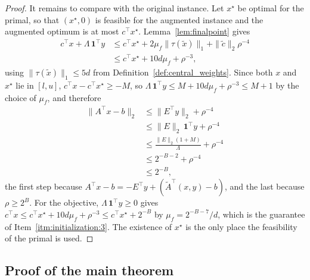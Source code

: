 \documentclass[11pt]{article}
\begin{document}
\begin{proof}
It remains to compare with the original instance. Let
$x^\star$ be optimal for the primal, so that
$(x^\star, 0)$ is feasible for the augmented instance and the augmented
optimum is at most
$c^\top x^\star$. Lemma~\ref{lem:finalpoint} gives
\[
\begin{aligned}
c^\top x + \Lambda \, \mathbf{1}^\top y
&\le
c^\top x^\star
+ 2 \mu_f \|\tau(\widetilde x)\|_1
+ \|\widetilde c\|_2 \rho^{-4}
\\
&\le
c^\top x^\star + 10 d \mu_f + \rho^{-3},
\end{aligned}
\]
using $\|\tau(\widetilde x)\|_1 \le 5 d$ from
Definition~\ref{def:central_weights}. Since both $x$ and
$x^\star$ lie in $[l, u]$,
$c^\top x - c^\top x^\star \ge -M$, so
$\Lambda \, \mathbf{1}^\top y \le M + 10 d \mu_f + \rho^{-3} \le M + 1$
by the choice of $\mu_f$, and therefore
\[
\begin{aligned}
\| A^\top x - b \|_2
&\le
\| E^\top y \|_2 + \rho^{-4}
\\
&\le
\|E\|_2 \, \mathbf{1}^\top y + \rho^{-4}
\\
&\le
\frac{ \|E\|_2 (1 + M) }{ \Lambda } + \rho^{-4}
\\
&\le
2^{-B - 2} + \rho^{-4}
\\
&\le
2^{-B},
\end{aligned}
\]
the first step because $A^\top x - b = -E^\top y + (\widetilde A^\top (x, y) - b)$,
and the last because $\rho \ge 2^{B}$. For the objective,
$\Lambda \, \mathbf{1}^\top y \ge 0$ gives
$c^\top x \le c^\top x^\star + 10 d \mu_f + \rho^{-3} \le c^\top x^\star + 2^{-B}$
by $\mu_f = 2^{-B - 7} / d$, which is the guarantee of
Item~\ref{itm:initialization:3}. The existence of $x^\star$ is the only
place the feasibility of the primal is used.
\end{proof}

\subsection{Proof of the main theorem}
\label{subsec:mainproof}
\end{document}
